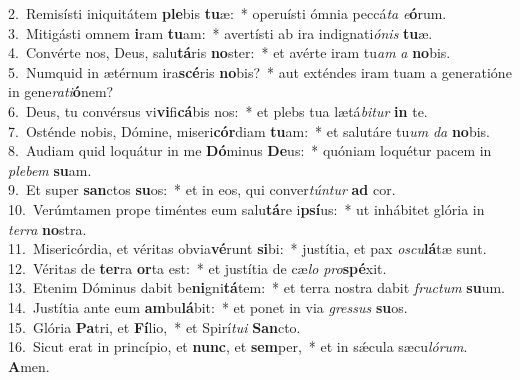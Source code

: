 {2.~}Remisísti iniquitátem \textbf{ple}bis \textbf{tu}æ:~* operuísti ómnia peccá\textit{ta} \textit{e}\textbf{ó}rum.\\
{3.~}Mitigásti omnem \textbf{i}ram \textbf{tu}am:~* avertísti ab ira indignati\textit{ó}\textit{nis} \textbf{tu}æ.\\
{4.~}Convérte nos, Deus, salu\textbf{tá}ris \textbf{no}ster:~* et avérte iram tu\textit{am} \textit{a} \textbf{no}bis.\\
{5.~}Numquid in ætérnum ira\textbf{scé}ris \textbf{no}bis?~* aut exténdes iram tuam a generatióne in gene\textit{ra}\textit{ti}\textbf{ó}nem?\\
{6.~}Deus, tu convérsus vi\textbf{vi}fi\textbf{cá}bis nos:~* et plebs tua lætá\textit{bi}\textit{tur} \textbf{in} te.\\
{7.~}Osténde nobis, Dómine, miseri\textbf{cór}diam \textbf{tu}am:~* et salutáre tu\textit{um} \textit{da} \textbf{no}bis.\\
{8.~}Audiam quid loquátur in me \textbf{Dó}minus \textbf{De}us:~* quóniam loquétur pacem in \textit{ple}\textit{bem} \textbf{su}am.\\
{9.~}Et super \textbf{san}ctos \textbf{su}os:~* et in eos, qui conver\textit{tún}\textit{tur} \textbf{ad} cor.\\
{10.~}Verúmtamen prope timéntes eum salu\textbf{tá}re i\textbf{psí}us:~* ut inhábitet glória in \textit{ter}\textit{ra} \textbf{no}stra.\\
{11.~}Misericórdia, et véritas obvia\textbf{vé}runt \textbf{si}bi:~* justítia, et pax \textit{o}\textit{scu}\textbf{lá}tæ sunt.\\
{12.~}Véritas de \textbf{ter}ra \textbf{or}ta est:~* et justítia de cæ\textit{lo} \textit{pro}\textbf{spé}xit.\\
{13.~}Etenim Dóminus dabit be\textbf{ni}gni\textbf{tá}tem:~* et terra nostra dabit \textit{fru}\textit{ctum} \textbf{su}um.\\
{14.~}Justítia ante eum \textbf{am}bu\textbf{lá}bit:~* et ponet in via \textit{gres}\textit{sus} \textbf{su}os.\\
{15.~}Glória \textbf{Pa}tri, et \textbf{Fí}lio,~* et Spirí\textit{tu}\textit{i} \textbf{San}cto.\\
{16.~}Sicut erat in princípio, et \textbf{nunc}, et \textbf{sem}per,~* et in sǽcula sæcu\textit{ló}\textit{rum}. \textbf{A}men.\\
